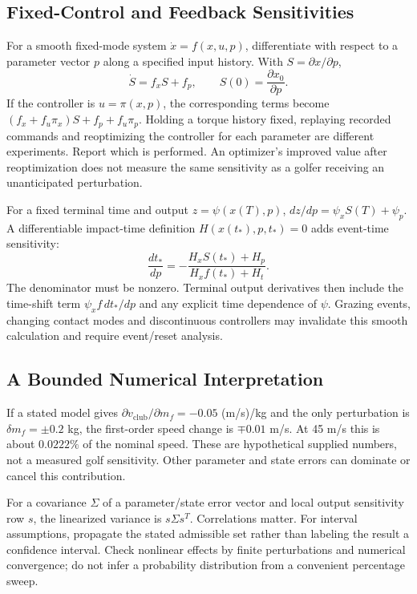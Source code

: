 \subsection{Fixed-Control and Feedback Sensitivities}

For a smooth fixed-mode system $\dot x=f(x,u,p)$, differentiate with respect to a parameter vector $p$ along a specified input history. With $S=\partial x/\partial p$,
\begin{equation}
\dot S=f_xS+f_p,\qquad S(0)=\frac{\partial x_0}{\partial p}.
\end{equation}
If the controller is $u=\pi(x,p)$, the corresponding terms become $(f_x+f_u\pi_x)S+f_p+f_u\pi_p$. Holding a torque history fixed, replaying recorded commands and reoptimizing the controller for each parameter are different experiments. Report which is performed. An optimizer's improved value after reoptimization does not measure the same sensitivity as a golfer receiving an unanticipated perturbation.

For a fixed terminal time and output $z=\psi(x(T),p)$, $dz/dp=\psi_xS(T)+\psi_p$. A differentiable impact-time definition $H(x(t_*),p,t_*)=0$ adds event-time sensitivity:
\begin{equation}
\frac{dt_*}{dp}=-\frac{H_xS(t_*)+H_p}{H_xf(t_*)+H_t}.
\end{equation}
The denominator must be nonzero. Terminal output derivatives then include the time-shift term $\psi_x f\,dt_*/dp$ and any explicit time dependence of $\psi$. Grazing events, changing contact modes and discontinuous controllers may invalidate this smooth calculation and require event/reset analysis.

\subsection{A Bounded Numerical Interpretation}
\label{ex:sensitivity}

If a stated model gives $\partial v_{\mathrm{club}}/\partial m_f=-0.05$ (m/s)/kg and the only perturbation is $\delta m_f=\pm0.2$ kg, the first-order speed change is $\mp0.01$ m/s. At 45 m/s this is about $0.0222\%$ of the nominal speed. These are hypothetical supplied numbers, not a measured golf sensitivity. Other parameter and state errors can dominate or cancel this contribution.

For a covariance $\Sigma$ of a parameter/state error vector and local output sensitivity row $s$, the linearized variance is $s\Sigma s^T$. Correlations matter. For interval assumptions, propagate the stated admissible set rather than labeling the result a confidence interval. Check nonlinear effects by finite perturbations and numerical convergence; do not infer a probability distribution from a convenient percentage sweep.

